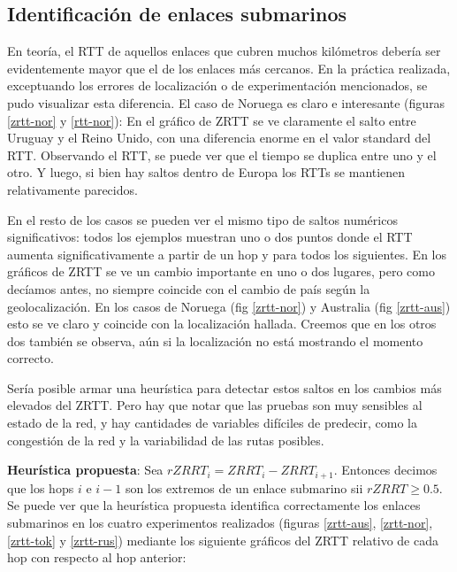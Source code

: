 \subsection{Identificación de enlaces submarinos}

En teoría, el RTT de aquellos enlaces que cubren muchos kilómetros debería ser evidentemente mayor que el de los enlaces más cercanos. En la práctica realizada, exceptuando los errores de localización o de experimentación mencionados, se pudo visualizar esta diferencia. El caso de Noruega es claro e interesante (figuras \ref{zrtt-nor} y \ref{rtt-nor}): En el gráfico de ZRTT se ve claramente el salto entre Uruguay y el Reino Unido, con una diferencia enorme en el valor standard del RTT. Observando el RTT, se puede ver que el tiempo se duplica entre uno y el otro. Y luego, si bien hay saltos dentro de Europa los RTTs se mantienen relativamente parecidos.

En el resto de los casos se pueden ver el mismo tipo de saltos numéricos significativos: todos los ejemplos muestran uno o dos puntos donde el RTT aumenta significativamente a partir de un hop y para todos los siguientes. En los gráficos de ZRTT se ve un cambio importante en uno o dos lugares, pero como decíamos antes, no siempre coincide con el cambio de país según la geolocalización. En los casos de Noruega (fig \ref{zrtt-nor}) y Australia (fig \ref{zrtt-aus}) esto se ve claro y coincide con la localización hallada. Creemos que en los otros dos también se observa, aún si la localización no está mostrando el momento correcto.

Sería posible armar una heurística para detectar estos saltos en los cambios más elevados del ZRTT. Pero hay que notar que las pruebas son muy sensibles al estado de la red, y hay cantidades de variables difíciles de predecir, como la congestión de la red y la variabilidad de las rutas posibles. %

\textbf{Heurística propuesta}: Sea $rZRRT_i = ZRRT_i - ZRRT_{i+1}$. Entonces decimos que los hops $i$ e $i-1$ son los extremos de un enlace submarino sii $rZRRT \geq 0.5$.\\

Se puede ver que la heurística propuesta identifica correctamente los enlaces submarinos en los cuatro experimentos realizados (figuras \ref{zrtt-aus}, \ref{zrtt-nor}, \ref{zrtt-tok} y \ref{zrtt-rus}) mediante los siguiente gráficos del ZRTT relativo de cada hop con respecto al hop anterior:

